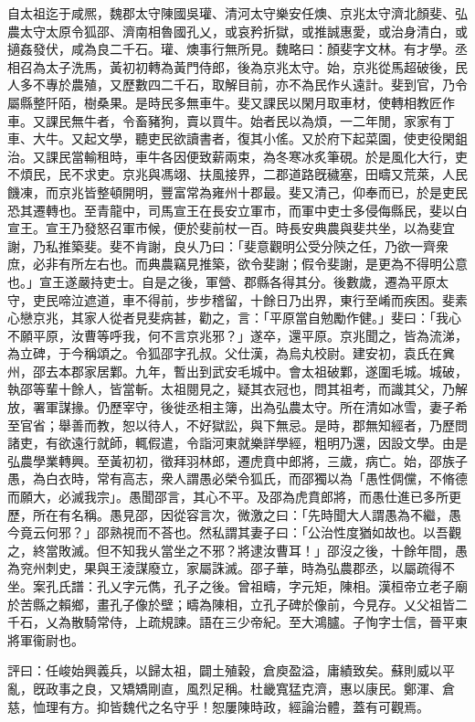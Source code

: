 \begin{pinyinscope}
自太祖迄于咸熈，魏郡太守陳國吳瓘、清河太守樂安任燠、京兆太守濟北顏斐、弘農太守太原令狐邵、濟南相魯國孔乂，或哀矜折獄，或推誠惠愛，或治身清白，或擿姦發伏，咸為良二千石。瓘、燠事行無所見。魏略曰：顏斐字文林。有才學。丞相召為太子洗馬，黃初初轉為黃門侍郎，後為京兆太守。始，京兆從馬超破後，民人多不專於農殖，又歷數四二千石，取解目前，亦不為民作乆遠計。斐到官，乃令屬縣整阡陌，樹桑果。是時民多無車牛。斐又課民以閑月取車材，使轉相教匠作車。又課民無牛者，令畜豬狗，賣以買牛。始者民以為煩，一二年閒，家家有丁車、大牛。又起文學，聽吏民欲讀書者，復其小傜。又於府下起菜園，使吏役閑鉏治。又課民當輸租時，車牛各因便致薪兩束，為冬寒冰炙筆硯。於是風化大行，吏不煩民，民不求吏。京兆與馮翊、扶風接界，二郡道路旣穢塞，田疇又荒萊，人民饑凍，而京兆皆整頓開明，豐富常為雍州十郡最。斐又清己，仰奉而已，於是吏民恐其遷轉也。至青龍中，司馬宣王在長安立軍市，而軍中吏士多侵侮縣民，斐以白宣王。宣王乃發怒召軍市候，便於斐前杖一百。時長安典農與斐共坐，以為斐宜謝，乃私推築斐。斐不肯謝，良乆乃曰：「斐意觀明公受分陝之任，乃欲一齊衆庶，必非有所左右也。而典農竊見推築，欲令斐謝；假令斐謝，是更為不得明公意也。」宣王遂嚴持吏士。自是之後，軍營、郡縣各得其分。後數歲，遷為平原太守，吏民啼泣遮道，車不得前，步步稽留，十餘日乃出界，東行至崤而疾困。斐素心戀京兆，其家人從者見斐病甚，勸之，言：「平原當自勉勵作健。」斐曰：「我心不願平原，汝曹等呼我，何不言京兆邪？」遂卒，還平原。京兆聞之，皆為流涕，為立碑，于今稱頌之。令狐邵字孔叔。父仕漢，為烏丸校尉。建安初，袁氏在兾州，邵去本郡家居鄴。九年，暫出到武安毛城中。會太祖破鄴，遂圍毛城。城破，執邵等輩十餘人，皆當斬。太祖閱見之，疑其衣冠也，問其祖考，而識其父，乃解放，署軍謀掾。仍歷宰守，後徙丞相主簿，出為弘農太守。所在清如冰雪，妻子希至官省；舉善而教，恕以待人，不好獄訟，與下無忌。是時，郡無知經者，乃歷問諸吏，有欲遠行就師，輒假遣，令詣河東就樂詳學經，粗明乃還，因設文學。由是弘農學業轉興。至黃初初，徵拜羽林郎，遷虎賁中郎將，三歲，病亡。始，邵族子愚，為白衣時，常有高志，衆人謂愚必榮令狐氏，而邵獨以為「愚性倜儻，不脩德而願大，必滅我宗」。愚聞邵言，其心不平。及邵為虎賁郎將，而愚仕進已多所更歷，所在有名稱。愚見邵，因從容言次，微激之曰：「先時聞大人謂愚為不繼，愚今竟云何邪？」邵熟視而不荅也。然私謂其妻子曰：「公治性度猶如故也。以吾觀之，終當敗滅。但不知我乆當坐之不邪？將逮汝曹耳！」邵沒之後，十餘年間，愚為兖州刺史，果與王淩謀廢立，家屬誅滅。邵子華，時為弘農郡丞，以屬疏得不坐。案孔氏譜：孔乂字元儁，孔子之後。曾祖疇，字元矩，陳相。漢桓帝立老子廟於苦縣之賴鄉，畫孔子像於壁；疇為陳相，立孔子碑於像前，今見存。乂父祖皆二千石，乂為散騎常侍，上疏規諫。語在三少帝紀。至大鴻臚。子恂字士信，晉平東將軍衞尉也。

評曰：任峻始興義兵，以歸太祖，闢土殖穀，倉庾盈溢，庸績致矣。蘇則威以平亂，旣政事之良，又矯矯剛直，風烈足稱。杜畿寬猛克濟，惠以康民。鄭渾、倉慈，恤理有方。抑皆魏代之名守乎！恕屢陳時政，經論治體，蓋有可觀焉。


\end{pinyinscope}